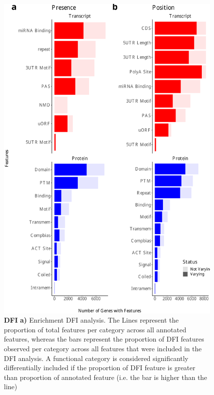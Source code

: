\begin{figure}[!htp]
	\centering
	\includegraphics[page=3,trim={0cm 20cm 0cm 0cm},scale = 0.6]{Figures/WholeFDA.pdf}
	\captionsetup{width=0.95\textwidth}
	\caption[DFI]%
	{\textbf{DFI} \textbf{a)} Enrichment DFI analysis. The Lines represent the proportion of total features per category across all annotated features, whereas the bars represent the proportion of DFI features observed per category across all features that were included in the DFI analysis. A functional category is considered significantly differentially included if the proportion of DFI feature is greater than proportion of annotated feature (i.e. the bar is higher than the line)}   
	\label{fig:DFI}
\end{figure}

\clearpage 
